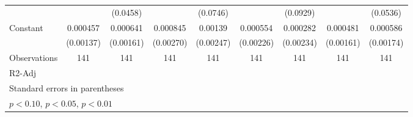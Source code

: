 \begin{table}[htbp]
\begin{tabular}{l*{8}{c}}
                    &                     &    (0.0458)         &                     &    (0.0746)         &                     &    (0.0929)         &                     &    (0.0536)         \\
[1em]
Constant            &    0.000457         &    0.000641         &    0.000845         &     0.00139         &    0.000554         &    0.000282         &    0.000481         &    0.000586         \\
                    &   (0.00137)         &   (0.00161)         &   (0.00270)         &   (0.00247)         &   (0.00226)         &   (0.00234)         &   (0.00161)         &   (0.00174)         \\
\hline
Observations        &         141         &         141         &         141         &         141         &         141         &         141         &         141         &         141         \\
R2-Adj              &                     &                     &                     &                     &                     &                     &                     &                     \\
\hline\hline
\multicolumn{9}{l}{\footnotesize Standard errors in parentheses}\\
\multicolumn{9}{l}{\footnotesize \sym{*} \(p<0.10\), \sym{**} \(p<0.05\), \sym{***} \(p<0.01\)}\\
\end{tabular}
\end{table}
